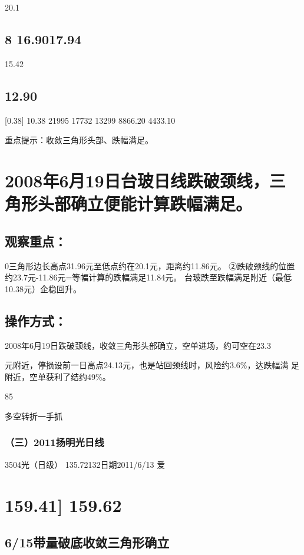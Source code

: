 \documentclass{article}
\begin{document}
20.1

\subsection{8 16.9017.94}

15.42

\subsection{12.90}

[0.38] 10.38 21995 17732 13299 8866.20 4433.10

重点提示：收敛三角形头部、跌幅满足。

\section{2008年6月19日台玻日线跌破颈线，三角形头部确立便能计算跌幅满足。}

\subsection{观察重点：}

0三角形边长高点31.96元至低点约在20.1元，距离约11.86元。 ②跌破颈线的位置约23.7元-11.86元=等幅计算的跌幅满足11.84元。 台玻跌至跌幅满足附近（最低10.38元）企稳回升。

\subsection{操作方式：}

2008年6月19日跌破颈线，收敛三角形头部确立，空单进场，约可空在23.3

元附近，停损设前一日高点24.13元，也是站回颈线时，风险约3.6\%，达跌幅满 足附近，空单获利了结约49\%。

85

\clearpage

多空转折一手抓

\subsubsection{（三）2011扬明光日线}

3504光（日级） 135.72132日期2011/6/13 爱

\section{159.41] 159.62}

\subsection{6/15带量破底收敛三角形确立}
\end{document}
